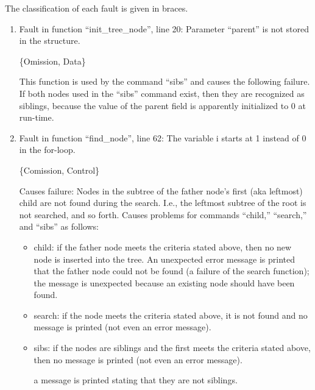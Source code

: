 
%
%

The classification of each fault is given in braces.

\begin{enumerate}

\item Fault in function ``init\_tree\_node'', line 20: 
Parameter ``parent'' is not stored in the structure.

\{Omission, Data\}

This function is used by the command ``sibs'' and causes 
the following failure.  If both nodes used in the ``sibs'' command
exist, then they are recognized as siblings, because the value 
of the parent field is apparently initialized to 0 at run-time.

\item Fault in function ``find\_node'', line 62:
The variable i starts at 1 instead of 0 in the for-loop.

\{Comission, Control\}

Causes failure: Nodes in the subtree of the father node's first
(aka leftmost) child are not found during the search.  I.e., 
the leftmost subtree of the root is not searched, and so forth.
Causes problems for commands ``child,'' ``search,'' and ``sibs'' 
as follows: 

\begin{itemize}

\item child: if the father node meets the criteria stated above,
then no new node is inserted into the tree. 
An unexpected error message is printed that the father node could not
be found (a failure of the search function); the message is unexpected
because an existing node should have been found.

\item search: if the node meets the criteria stated above, it is not
found and no message is printed (not even an error message).

\item sibs: if the nodes are siblings and the first meets the criteria
stated above, then no message is printed (not even an error message).

a message is printed stating that they are not
siblings. 

\end{itemize}


% 
% 
% 


\end{enumerate}
